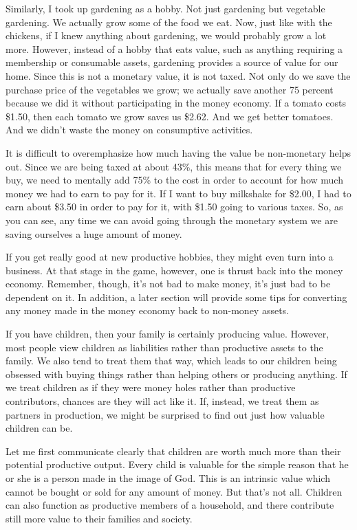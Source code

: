 Similarly, I took up gardening as a hobby. Not just gardening but
vegetable gardening. We actually grow some of the food we eat. Now,
just like with the chickens, if I knew anything about gardening, we
would probably grow a lot more. However, instead of a hobby that eats
value, such as anything requiring a membership or consumable assets,
gardening provides a source of value for our home. Since this is not a
monetary value, it is not taxed. Not only do we save the purchase price
of the vegetables we grow; we actually save another 75 percent because
we did it without participating in the money economy. If a tomato costs
\$1.50, then each tomato we grow saves us \$2.62. And we get better
tomatoes. And we didn’t waste the money on consumptive activities.

It is difficult to overemphasize how much having the value be non-monetary helps
out.  Since we are being taxed at about 43\%, this means that for every thing we buy,
we need to mentally add 75\% to the cost in order to account for how much money
we had to earn to pay for it.  If I want to buy milkshake for \$2.00, I had to 
earn about \$3.50 in order to pay for it, with \$1.50 going to various taxes.  So,
as you can see, any time we can avoid going through the monetary system we are
saving ourselves a huge amount of money.

If you get really good at new productive hobbies, they might even turn
into a business. At that stage in the game, however, one is thrust back
into the money economy.  Remember, though, it's not
bad to make money, it's just bad to be dependent on
it.  In addition, a later section will provide some tips for converting
any money made in the money economy back to non-money assets. 

If you have children, then your family is certainly producing value.
However, most people view children as liabilities rather than
productive assets to the family. We also tend to treat them that way,
which leads to our children being obsessed with buying things rather
than helping others or producing anything. If we treat
children as if they
were money holes rather than productive contributors, chances are they
will act like it. If, instead, we treat them as partners in production,
we might be surprised to find out just how valuable children can be. 

Let me first communicate clearly that children are worth
much more than their
potential productive output. Every child is valuable for the simple
reason that he or she is a person made in the image of God.  This is an
intrinsic value which cannot be bought or sold for any amount of money.
 But that's not all.  Children can also function as
productive members of a household, and there contribute still more value to
their families and society.

